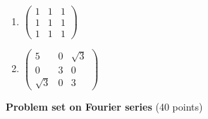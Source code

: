 \documentclass[fleqn]{article}
\begin{document}
\begin{enumerate}
\begin{enumerate}
    \item  $\left( 
    \begin{array}{rrr}
    1 & 1 & 1 \\ 
    1 & 1 & 1 \\ 
    1 & 1 & 1
    \end{array}
    \right) $
    
    \item  $\left( 
    \begin{array}{rrr}
    5 & 0 & \sqrt{3} \\ 
    0 & 3 & 0 \\ 
    \sqrt{3} & 0 & 3
    \end{array}
    \right) $
    \end{enumerate}
    

\end{enumerate}

\pagebreak

\textbf{Problem set on Fourier series} (40 points)
\end{document}
